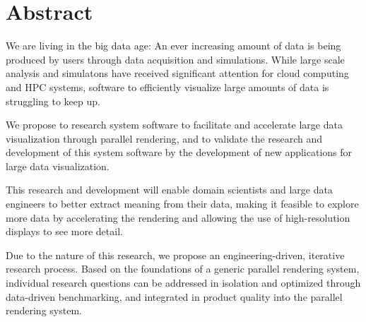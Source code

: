 

\chapter*{Abstract}
We are living in the big data age: An ever increasing amount of data is being
produced by users through data acquisition and simulations. While large scale
analysis and simulatons have received significant attention for cloud computing
and HPC systems, software to efficiently visualize large amounts of data is
struggling to keep up.

We propose to research system software to facilitate and accelerate large data
visualization through parallel rendering, and to validate the research and
development of this system software by the development of new applications for
large data visualization.

This research and development will enable domain scientists and large data
engineers to better extract meaning from their data, making it feasible to
explore more data by accelerating the rendering and allowing the use of
high-resolution displays to see more detail.

Due to the nature of this research, we propose an engineering-driven, iterative
research process. Based on the foundations of a generic parallel rendering
system, individual research questions can be addressed in isolation and
optimized through data-driven benchmarking, and integrated in product quality
into the parallel rendering system.
